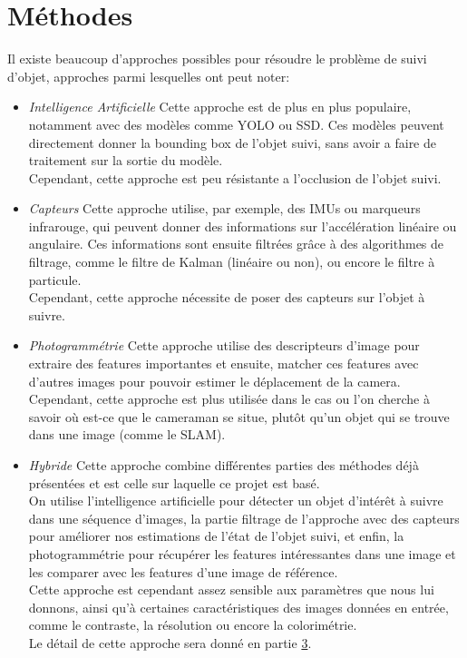 \section{Méthodes}
Il existe beaucoup d'approches possibles pour résoudre le problème de suivi d'objet, approches parmi lesquelles ont peut noter:
\begin{itemize}
	\item \textit{Intelligence Artificielle}\newline
	Cette approche est de plus en plus populaire, notamment avec des modèles comme YOLO\cite{redmon_you_2016} ou SSD\cite{liu_ssd_2016}. Ces modèles peuvent directement donner la bounding box de l'objet suivi, sans avoir a faire de traitement sur la sortie du modèle.\\
	Cependant, cette approche est peu résistante a l'occlusion de l'objet suivi.\\
	
	\item \textit{Capteurs}\newline
	Cette approche utilise, par exemple, des IMUs ou marqueurs infrarouge, qui peuvent donner des informations sur l'accélération linéaire ou angulaire. Ces informations sont ensuite filtrées grâce à des algorithmes de filtrage, comme le filtre de Kalman (linéaire ou non), ou encore le filtre à particule.\\
	Cependant, cette approche nécessite de poser des capteurs sur l'objet à suivre.\\
	
	\item \textit{Photogrammétrie}\newline
	Cette approche utilise des descripteurs d'image pour extraire des features importantes et ensuite, matcher ces features avec d'autres images pour pouvoir estimer le déplacement de la camera.\\
	Cependant, cette approche est plus utilisée dans le cas ou l'on cherche à savoir où est-ce que le cameraman se situe, plutôt qu'un objet qui se trouve dans une image (comme le SLAM).\\
	
	\item \textit{Hybride}\newline
	Cette approche combine différentes parties des méthodes déjà présentées et est celle sur laquelle ce projet est basé.\\
	On utilise l'intelligence artificielle pour détecter un objet d'intérêt à suivre dans une séquence d'images, la partie filtrage de l'approche avec des capteurs pour améliorer nos estimations de l'état de l'objet suivi, et enfin, la photogrammétrie pour récupérer les features intéressantes dans une image et les comparer avec les features d'une image de référence.\\
	Cette approche est cependant assez sensible aux paramètres que nous lui donnons, ainsi qu'à certaines caractéristiques des images données en entrée, comme le contraste, la résolution ou encore la colorimétrie.\\
	Le détail de cette approche sera donné en partie \hyperlink{chapter.3}{3}.\\
\end{itemize}
